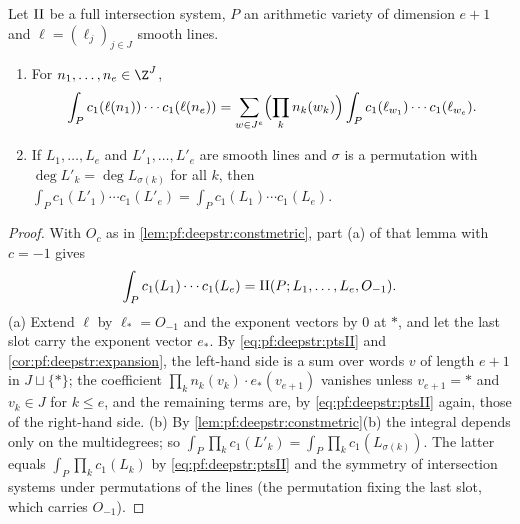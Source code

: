 \begin{lemma}\label{lem:pf:deepstr:chernint}
Let $\mathrm{II}$ be a full intersection system, $P$ an arithmetic variety of dimension $e+1$ and
$\ell=(\ell_j)_{j\in J}$ smooth lines.
\begin{enumerate}[label=(\alph*)]
\item For $n_1,\dots,n_e\in\Z^J$,
\[
\int_Pc_1(\ell(n_1))\cdots c_1(\ell(n_e))=\sum_{w\in J^e}\Bigl(\prod_kn_k(w_k)\Bigr)\int_Pc_1(\ell_{w_1})\cdots c_1(\ell_{w_e}).
\]
\item If $L_1,\dots,L_e$ and $L'_1,\dots,L'_e$ are smooth lines and $\sigma$ is a permutation with
$\deg L'_k=\deg L_{\sigma(k)}$ for all $k$, then $\int_Pc_1(L'_1)\cdots c_1(L'_e)=\int_Pc_1(L_1)\cdots c_1(L_e)$.
\end{enumerate}
\end{lemma}

\begin{proof}
With $O_c$ as in \cref{lem:pf:deepstr:constmetric}, part (a) of that lemma with $c=-1$ gives
\begin{equation}\label{eq:pf:deepstr:ptsII}
\int_Pc_1(L_1)\cdots c_1(L_e)=\mathrm{II}(P;L_1,\dots,L_e,O_{-1}).
\end{equation}
(a) Extend $\ell$ by $\ell_\ast=O_{-1}$ and the exponent vectors by $0$ at $\ast$, and let the last slot carry the
exponent vector $e_\ast$. By \eqref{eq:pf:deepstr:ptsII} and \cref{cor:pf:deepstr:expansion}, the left-hand side is
a sum over words $v$ of length $e+1$ in $J\sqcup\{\ast\}$; the coefficient $\prod_kn_k(v_k)\cdot e_\ast(v_{e+1})$ vanishes
unless $v_{e+1}=\ast$ and $v_k\in J$ for $k\le e$, and the remaining terms are, by \eqref{eq:pf:deepstr:ptsII} again,
those of the right-hand side.
(b) By \cref{lem:pf:deepstr:constmetric}(b) the integral depends only on the multidegrees; so
$\int_P\prod_kc_1(L'_k)=\int_P\prod_kc_1(L_{\sigma(k)})$. The latter equals $\int_P\prod_kc_1(L_k)$ by
\eqref{eq:pf:deepstr:ptsII} and the symmetry of intersection systems under permutations of the lines (the
permutation fixing the last slot, which carries $O_{-1}$).
\end{proof}

